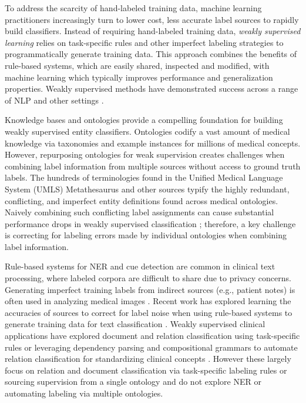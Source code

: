 \documentclass{article}
\begin{document}
To address the scarcity of hand-labeled training data, machine learning practitioners increasingly turn to lower cost, less accurate label sources to rapidly build classifiers. 
Instead of requiring hand-labeled training data, \emph{weakly supervised learning} relies on task-specific rules and other imperfect labeling strategies to programmatically generate training data. 
This approach combines the benefits of rule-based systems, which are easily shared, inspected and modified, with machine learning which typically improves performance and generalization properties. 
Weakly supervised methods have demonstrated success across a range of NLP and other settings \cite{Kuleshov2019-cj,Fries2019-eb,Khattar_undated-zp,DBLP:conf/nips/VarmaSSFFKRXFPR19,Dunnmon2020-jf} .

Knowledge bases and ontologies provide a compelling foundation for building weakly supervised entity classifiers. 
Ontologies codify a vast amount of medical knowledge via taxonomies and example instances for millions of medical concepts. 
However, repurposing ontologies for weak supervision creates challenges when combining label information from multiple sources without access to ground truth labels. 
The hundreds of terminologies found in the Unified Medical Language System (UMLS) Metathesaurus \cite{Bodenreider2004-wh} and other sources \cite{Jonquet2009-jx} typify the highly redundant, conflicting, and imperfect entity definitions found across medical ontologies. 
Naively combining such conflicting label assignments can cause substantial performance drops in weakly supervised classification \cite{Ratner2017-rc}; therefore, a key challenge is correcting for labeling errors made by individual ontologies when combining label information. 

Rule-based systems for NER and cue detection \cite{Chapman2001-or,Peng2018-nl} are common in clinical text processing, where labeled corpora are difficult to share due to privacy concerns. 
Generating imperfect training labels from indirect sources (e.g., patient notes) is often used in analyzing medical images \cite{Wang2017-js,Rajpurkar2018-rk,Draelos2020-dx}. 
Recent work has explored learning the accuracies of sources to correct for label noise when using rule-based systems {to generate training data for text classification \cite{Kuleshov2019-cj,Ratner2019-xo}. 
Weakly supervised clinical applications have explored document and relation classification using task-specific rules \cite{Wang2019-kp,Callahan2019-mz} or leveraging dependency parsing and compositional grammars to automate relation classification for standardizing clinical concepts \cite{peterson2020corpus}.}
However these largely focus on {relation and document classification} via task-specific labeling rules {or sourcing supervision from a single ontology} and do not explore NER or automating labeling via multiple ontologies. 
\end{document}
